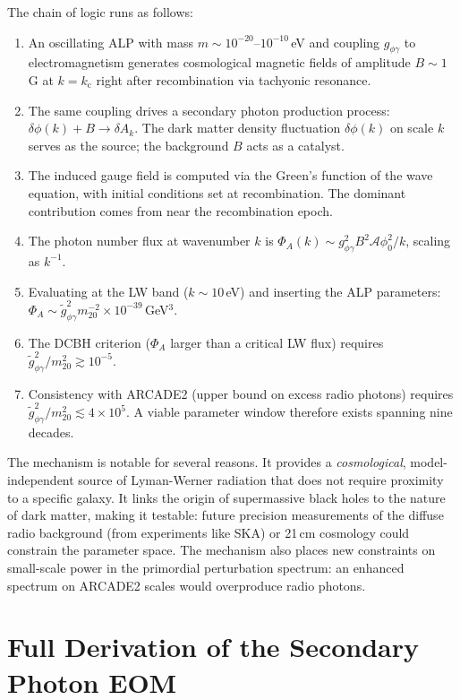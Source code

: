 \documentclass[12pt,a4paper]{report}
\newcommand{\kc}{k_{\mathrm{c}}}
\newcommand{\gag}{g_{\phi\gamma}}
\newcommand{\gtag}{\tilde{g}_{\phi\gamma}}
\newcommand{\phizero}{\phi_0}
\theoremstyle{definition}
\begin{document}
The chain of logic runs as follows:
\begin{enumerate}
  \item An oscillating ALP with mass $m\sim 10^{-20}$--$10^{-10}$\,eV and coupling
    $\gag$ to electromagnetism generates cosmological magnetic fields of amplitude
    $B\sim 1$\,G at $k=\kc$ right after recombination via tachyonic resonance.
  \item The same coupling drives a secondary photon production process:
    $\delta\phi(k) + B\to\delta A_k$. The dark matter density fluctuation $\delta\phi(k)$
    on scale $k$ serves as the source; the background $B$ acts as a catalyst.
  \item The induced gauge field is computed via the Green's function of the wave
    equation, with initial conditions set at recombination. The dominant contribution
    comes from near the recombination epoch.
  \item The photon number flux at wavenumber $k$ is
    $\Phi_A(k)\sim\gag^2 B^2\mathcal{A}\phizero^2/k$, scaling as $k^{-1}$.
  \item Evaluating at the LW band ($k\sim 10$\,eV) and inserting the ALP parameters:
    $\Phi_A\sim\gtag^2 m_{20}^{-2}\times 10^{-39}$\,GeV$^3$.
  \item The DCBH criterion ($\Phi_A$ larger than a critical LW flux) requires
    $\gtag^2/m_{20}^2\gtrsim 10^{-5}$.
  \item Consistency with ARCADE2 (upper bound on excess radio photons) requires
    $\gtag^2/m_{20}^2\lesssim 4\times 10^5$. A viable parameter window therefore
    exists spanning nine decades.
\end{enumerate}

The mechanism is notable for several reasons. It provides a \emph{cosmological}, 
model-independent source of Lyman-Werner radiation that does not require proximity 
to a specific galaxy. It links the origin of supermassive black holes to the 
nature of dark matter, making it testable: future precision measurements of the 
diffuse radio background (from experiments like SKA) or 21\,cm cosmology could
constrain the parameter space. The mechanism also places new constraints on 
small-scale power in the primordial perturbation spectrum: an enhanced spectrum 
on ARCADE2 scales would overproduce radio photons.

\appendix

\chapter{Full Derivation of the Secondary Photon EOM}
\label{app:EOM_derivation}
\end{document}
